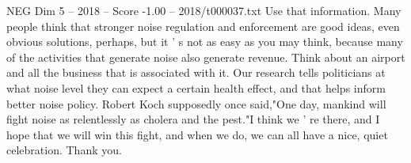 \begin{textsample}{NEG Dim 5 – 2018 – Score -1.00 – 2018/t000037.txt}
Use that information.
Many people think that stronger noise regulation and enforcement are good ideas, even obvious solutions, perhaps, but it ' s not as easy as you may think, because many of the activities that generate noise also generate revenue.
Think about an airport and all the business that is associated with it.
Our research tells politicians at what noise level they can expect a certain health effect, and that helps inform better noise policy.
Robert Koch supposedly once said,"One day, mankind will fight noise as relentlessly as cholera and the pest."I think we ' re there, and I hope that we will win this fight, and when we do, we can all have a nice, quiet celebration.
Thank you.

\end{textsample}
